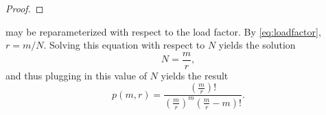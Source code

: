 \documentclass[hidelinks,11pt,final]{article}
\theoremstyle{plain}
\begin{document}
\begin{proof}
\end{proof}

 may be reparameterized with respect to the load factor. By \cref{eq:loadfactor}, $r = m/N$. Solving this equation with respect to $N$ yields the solution
\begin{equation}
    N = \frac{m}{r},
\end{equation}
and thus plugging in this value of $N$ yields the result
\begin{equation}
\label{eq:p_m_r}
    p(m,r) = \frac{\left(\frac{m}{r}\right)!}{\left(\frac{m}{r}\right)^m \left(\frac{m}{r}-m\right)!}.
\end{equation}
\end{document}
